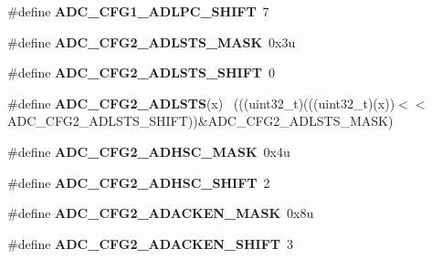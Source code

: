 \begin{DoxyCompactItemize}
\item 
\hypertarget{group___a_d_c___register___masks_ga15e7cf514347ab7f32e2104b1776704e}{}\#define {\bfseries A\+D\+C\+\_\+\+C\+F\+G1\+\_\+\+A\+D\+L\+P\+C\+\_\+\+S\+H\+I\+F\+T}~7\label{group___a_d_c___register___masks_ga15e7cf514347ab7f32e2104b1776704e}

\item 
\hypertarget{group___a_d_c___register___masks_ga99f0b4983922eca1e6ed86d053fe41db}{}\#define {\bfseries A\+D\+C\+\_\+\+C\+F\+G2\+\_\+\+A\+D\+L\+S\+T\+S\+\_\+\+M\+A\+S\+K}~0x3u\label{group___a_d_c___register___masks_ga99f0b4983922eca1e6ed86d053fe41db}

\item 
\hypertarget{group___a_d_c___register___masks_ga8d39dceb9fa2550294f0623cc1fbc3f3}{}\#define {\bfseries A\+D\+C\+\_\+\+C\+F\+G2\+\_\+\+A\+D\+L\+S\+T\+S\+\_\+\+S\+H\+I\+F\+T}~0\label{group___a_d_c___register___masks_ga8d39dceb9fa2550294f0623cc1fbc3f3}

\item 
\hypertarget{group___a_d_c___register___masks_gaad22846dfbf62cd4933f59beb3d37a63}{}\#define {\bfseries A\+D\+C\+\_\+\+C\+F\+G2\+\_\+\+A\+D\+L\+S\+T\+S}(x)                                          ~(((uint32\+\_\+t)(((uint32\+\_\+t)(x))$<$$<$A\+D\+C\+\_\+\+C\+F\+G2\+\_\+\+A\+D\+L\+S\+T\+S\+\_\+\+S\+H\+I\+F\+T))\&A\+D\+C\+\_\+\+C\+F\+G2\+\_\+\+A\+D\+L\+S\+T\+S\+\_\+\+M\+A\+S\+K)\label{group___a_d_c___register___masks_gaad22846dfbf62cd4933f59beb3d37a63}

\item 
\hypertarget{group___a_d_c___register___masks_ga73cb928c5cacb18e02a3f0d67dcf1e6f}{}\#define {\bfseries A\+D\+C\+\_\+\+C\+F\+G2\+\_\+\+A\+D\+H\+S\+C\+\_\+\+M\+A\+S\+K}~0x4u\label{group___a_d_c___register___masks_ga73cb928c5cacb18e02a3f0d67dcf1e6f}

\item 
\hypertarget{group___a_d_c___register___masks_ga447389268d77124eb2012fd98bfe07ce}{}\#define {\bfseries A\+D\+C\+\_\+\+C\+F\+G2\+\_\+\+A\+D\+H\+S\+C\+\_\+\+S\+H\+I\+F\+T}~2\label{group___a_d_c___register___masks_ga447389268d77124eb2012fd98bfe07ce}

\item 
\hypertarget{group___a_d_c___register___masks_ga1158034a83b78e238c3f8ca481ab9b27}{}\#define {\bfseries A\+D\+C\+\_\+\+C\+F\+G2\+\_\+\+A\+D\+A\+C\+K\+E\+N\+\_\+\+M\+A\+S\+K}~0x8u\label{group___a_d_c___register___masks_ga1158034a83b78e238c3f8ca481ab9b27}

\item 
\hypertarget{group___a_d_c___register___masks_gad009e6fe93b9f44fb0f79cd479d8bb1a}{}\#define {\bfseries A\+D\+C\+\_\+\+C\+F\+G2\+\_\+\+A\+D\+A\+C\+K\+E\+N\+\_\+\+S\+H\+I\+F\+T}~3\label{group___a_d_c___register___masks_gad009e6fe93b9f44fb0f79cd479d8bb1a}


\end{DoxyCompactItemize}
